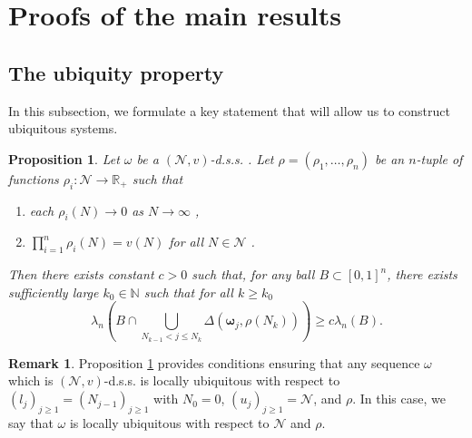 \documentclass{amsart}
\newtheorem{proposition}[theorem]{Proposition}
\theoremstyle{definition}
\newtheorem{remark}[theorem]{Remark}
\newcommand{\N}{\mathbb N}%
\newcommand{\R}{\mathbb R}
\newcommand{\0}{\mbf 0}%
\newcommand{\cN}{{\mathcal N}}
\def\N{\mathbb N}
\def\R{\mathbb R}
\begin{document}
\section{Proofs of the main results}



\subsection{The ubiquity property}
In this subsection, we formulate a key statement that will allow us to construct ubiquitous systems.


\begin{proposition} \label{ubiquity statement}
    Let $\omega$ be a $(\cN,v)$-d.s.s. . Let $\rho=(\rho_{1},\dots,\rho_{n})$ be an $n$-tuple of functions $\rho_{i}:\cN \to \R_{+}$ such that
    \begin{enumerate}
        \item[i)] each $\rho_{i}(N)\to 0$ as $N\to \infty$ ,
        \item[ii)] $\prod_{i=1}^{n}\rho_{i}(N)=v(N)$ for all $N\in\cN$ .
    \end{enumerate}
    Then there exists constant $c>0$ such that, for any ball $B\subset [0,1]^{n}$, there exists sufficiently large $k_{0}\in\N$ such that for all $k\geq k_{0}$
    \begin{equation*}
        \lambda_n\left( B\cap \bigcup_{N_{k-1}<j\leq N_{k}}\Delta\left(\boldsymbol{\omega}_{j},\rho(N_{k})\right)\right) \geq c\lambda_n(B).
    \end{equation*}
\end{proposition}

\begin{remark}
Proposition \ref{ubiquity statement} provides conditions ensuring that any sequence $\omega$ which is $(\cN,v)$-d.s.s. is locally ubiquitous with respect to $(l_j)_{j\geq 1}=(N_{j-1})_{j \geq 1}$ with $N_0=0$, $(u_j)_{j\geq 1}=\cN$, and $\rho$. In this case, we say that $\omega$ is locally ubiquitous with respect to $\cN$ and $\rho$.
\end{remark}
\end{document}
